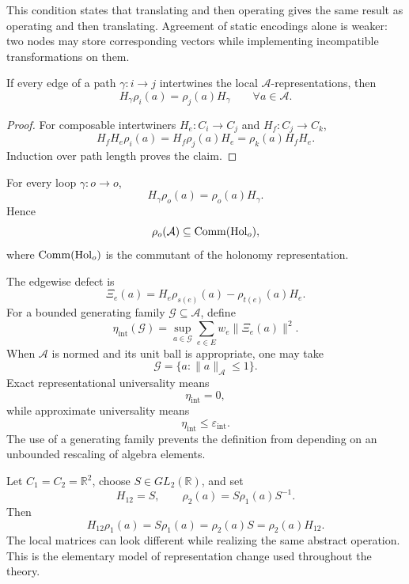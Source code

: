 This condition states that translating and then operating gives the same
result as operating and then translating. Agreement of static encodings alone
is weaker: two nodes may store corresponding vectors while implementing
incompatible transformations on them.

\begin{proposition}\label{prop:path-intertwiner}
If every edge of a path \(\gamma:i\to j\) intertwines the local
\(\mathcal A\)-representations, then
\[
H_\gamma\rho_i(a)=\rho_j(a)H_\gamma
\qquad
\forall a\in\mathcal A.
\]
\end{proposition}

\begin{proof}
For composable intertwiners \(H_e:C_i\to C_j\) and
\(H_f:C_j\to C_k\),
\[
H_fH_e\rho_i(a)
=H_f\rho_j(a)H_e
=\rho_k(a)H_fH_e.
\]
Induction over path length proves the claim.
\end{proof}

\begin{corollary}\label{cor:holonomy-commutes}
For every loop \(\gamma:o\to o\),
\[
H_\gamma\rho_o(a)=\rho_o(a)H_\gamma.
\]
Hence
\[
\rho_o(\mathcal A)
\subseteq
\operatorname{Comm}(\operatorname{Hol}_o),
\]
where \(\operatorname{Comm}(\operatorname{Hol}_o)\) is the commutant of the holonomy
representation.
\end{corollary}


The edgewise defect is
\[
\Xi_e(a)
=
H_e\rho_{s(e)}(a)-\rho_{t(e)}(a)H_e.
\]
For a bounded generating family \(\mathcal G\subseteq\mathcal A\), define
\[
\eta_{\mathrm{int}}(\mathcal G)
=
\sup_{a\in\mathcal G}
\sum_{e\in E}w_e\|\Xi_e(a)\|^2.
\]
When \(\mathcal A\) is normed and its unit ball is appropriate, one may take
\[
\mathcal G=\{a:\|a\|_{\mathcal A}\leq1\}.
\]
Exact representational universality means
\[
\eta_{\mathrm{int}}=0,
\]
while approximate universality means
\[
\eta_{\mathrm{int}}\leq\varepsilon_{\mathrm{int}}.
\]
The use of a generating family prevents the definition from depending on an
unbounded rescaling of algebra elements.

\begin{example}\label{ex:coordinate-intertwiner}
Let \(C_1=C_2=\mathbb R^2\), choose \(S\in GL_2(\mathbb R)\), and set
\[
H_{12}=S,
\qquad
\rho_2(a)=S\rho_1(a)S^{-1}.
\]
Then
\[
H_{12}\rho_1(a)
=S\rho_1(a)
=\rho_2(a)S
=\rho_2(a)H_{12}.
\]
The local matrices can look different while realizing the same abstract
operation. This is the elementary model of representation change used
throughout the theory.
\end{example}

